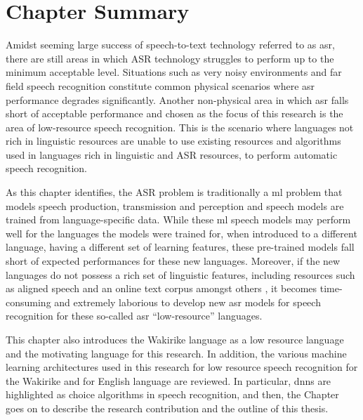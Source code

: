 \section{Chapter Summary}
Amidst seeming large success of speech-to-text technology referred to as \acrfull{asr}, there are still areas in which ASR technology struggles to perform up to the minimum acceptable level.  Situations such as very noisy environments and far field speech recognition constitute common physical scenarios where \acrshort{asr} performance degrades significantly.  Another non-physical area in which \acrshort{asr} falls short of acceptable performance and chosen as the focus of this research is the area of low-resource speech recognition.  This is the scenario where languages not rich in linguistic resources are unable to use existing resources and algorithms used in languages rich in linguistic and ASR resources, to perform automatic speech recognition. 

As this chapter identifies, the ASR problem is traditionally a \acrlong{ml} problem that models   speech production, transmission and perception and speech models are trained from language-specific data. While these \acrshort{ml} speech models may perform well for the languages the models were trained for, when introduced to a different language, having a different set of learning features, these pre-trained models fall short of expected performances for these new languages. Moreover, if the new languages do not possess a rich set of linguistic features, including resources such as aligned speech and an online text corpus amongst others \citep{besacier2014introduction}, it becomes time-consuming and extremely laborious to develop new \acrshort{asr} models for speech recognition for these so-called \acrshort{asr} ``low-resource'' languages.

This chapter also introduces the Wakirike language as a low resource language and the motivating language for this research.  In addition, the various machine learning architectures used in this research for low resource speech recognition for the Wakirike and for English language are reviewed. In particular, \acrfull{dnns} are highlighted as choice algorithms in speech recognition, and then, the Chapter goes on to describe the research contribution and the outline of this thesis.


